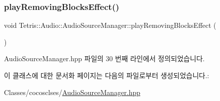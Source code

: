 \subsubsection{\texorpdfstring{play\+Removing\+Blocks\+Effect()}{playRemovingBlocksEffect()}}
{\footnotesize\ttfamily void Tetris\+::\+Audio\+::\+Audio\+Source\+Manager\+::play\+Removing\+Blocks\+Effect (\begin{DoxyParamCaption}{ }\end{DoxyParamCaption})\hspace{0.3cm}{\ttfamily [inline]}}



Audio\+Source\+Manager.\+hpp 파일의 30 번째 라인에서 정의되었습니다.



이 클래스에 대한 문서화 페이지는 다음의 파일로부터 생성되었습니다.\+:\begin{DoxyCompactItemize}
\item 
Classes/cocosclses/\hyperlink{_audio_source_manager_8hpp}{Audio\+Source\+Manager.\+hpp}\end{DoxyCompactItemize}
